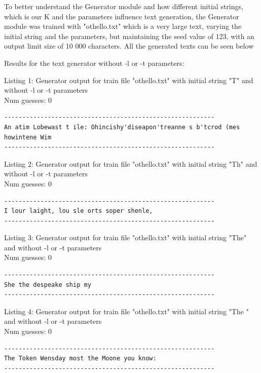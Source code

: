 \documentclass{article}
\begin{document}
To better understand the Generator module and how different initial strings, which is our K and the parameters influence
text generation, the Generator module was trained with "othello.txt" which is a very large text, varying the initial string and the parameters, but
maintaining the seed value of 123, with an output limit size of 10 000 characters.
All the generated texts can be seen below

Results for the text generator without -l or -t parameters:

\hfill

Listing 1: Generator output for train file "othello.txt" with initial string "T" and without -l or -t parameters
\\Num guesses: 0

\begin{lstlisting}
----------------------------------------------------------
An atim Lobewast t ile: Ohincishy'diseapon'treanne s b'tcrod (mes howintene Wim
----------------------------------------------------------
\end{lstlisting}

Listing 2: Generator output for train file "othello.txt" with initial string "Th" and without -l or -t parameters
\\Num guesses: 0

\begin{lstlisting}
----------------------------------------------------------
I lour laight, lou sle orts soper shenle,
----------------------------------------------------------
\end{lstlisting}

Listing 3: Generator output for train file "othello.txt" with initial string "The" and without -l or -t parameters
\\Num guesses: 0

\begin{lstlisting}
----------------------------------------------------------
She the despeake ship my
----------------------------------------------------------
\end{lstlisting}

Listing 4: Generator output for train file "othello.txt" with initial string "The " and without -l or -t parameters
\\Num guesses: 0

\begin{lstlisting}
----------------------------------------------------------
The Token Wensday most the Moone you know:
----------------------------------------------------------
\end{lstlisting}
\end{document}

